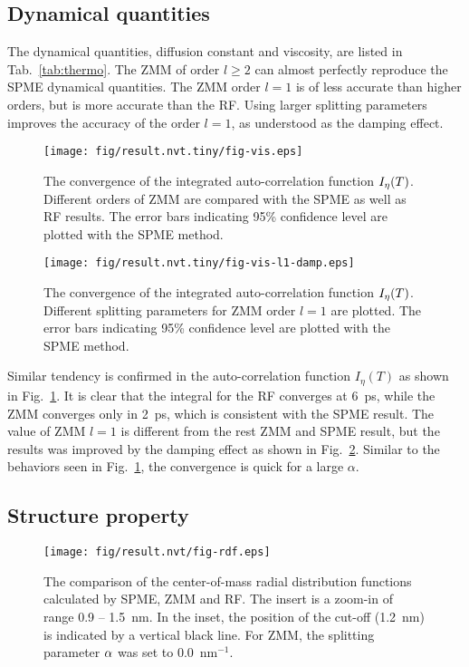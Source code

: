 \documentclass[a4paper,preprint,unsortedaddress,onecolumn,fleqn]{revtex4}
\begin{document}
\subsection{Dynamical quantities}

The dynamical quantities, diffusion constant and viscosity, are listed in
Tab.~\ref{tab:thermo}. The ZMM  of order $l\geq 2$ can almost perfectly
reproduce the SPME dynamical quantities. The ZMM order $l=1$ is of less
accurate than higher orders, but is more accurate than the RF. Using larger
splitting parameters improves the accuracy of the order $l=1$, as understood
as the damping effect.

\begin{figure}[tbp]
\centering
\texttt{[image: fig/result.nvt.tiny/fig-vis.eps]}
\caption{The convergence of the integrated auto-correlation function $I_{%
\protect\eta }(T)$. Different orders of ZMM  are compared with the SPME
as well as RF results. The error bars indicating 95\% confidence level are
plotted with the SPME method. }
\label{fig:conv-vis}
\end{figure}

\begin{figure}[tbp]
\centering
\texttt{[image: fig/result.nvt.tiny/fig-vis-l1-damp.eps]}
\caption{The convergence of the integrated auto-correlation function $I_{%
\protect\eta }(T)$. Different splitting parameters for ZMM order $l=1$ are
plotted. The error bars indicating 95\% confidence level are plotted with
the SPME method. }
\label{fig:conv-vis-damp}
\end{figure}

Similar tendency is confirmed in the auto-correlation function $I_{\eta }(T)$
as shown in Fig.~\ref{fig:conv-vis}. It is clear that the integral for the
RF  converges at 6~ps, while the ZMM  converges only in 2~ps,
which is consistent with the SPME result. The value of ZMM $l=1$  is
different from the rest ZMM  and SPME result, but the results was
improved by the damping effect as shown in Fig.~\ref{fig:conv-vis-damp}.
Similar to the behaviors seen in Fig.~\ref{fig:conv-vis}, the convergence is
quick for a large $\alpha $.

\subsection{Structure property}

\begin{figure}[tbp]
\centering
\texttt{[image: fig/result.nvt/fig-rdf.eps]}
\caption{The comparison of the center-of-mass radial distribution functions
calculated by SPME, ZMM and RF. The insert is a zoom-in of range 0.9
-- 1.5~nm. In the inset, the position of the cut-off (1.2~nm) is indicated
by a vertical black line. For ZMM, the splitting parameter $\protect%
\alpha $ was set to 0.0~$\text{nm}^{-1}$. }
\label{fig:rdf}
\end{figure}
\end{document}
